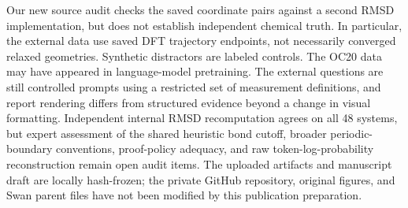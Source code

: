 Our new source audit checks the saved coordinate pairs against a second RMSD implementation, but does not establish independent chemical truth. In particular, the external data use saved DFT trajectory endpoints, not necessarily converged relaxed geometries. Synthetic distractors are labeled controls. The OC20 data may have appeared in language-model pretraining. The external questions are still controlled prompts using a restricted set of measurement definitions, and report rendering differs from structured evidence beyond a change in visual formatting. Independent internal RMSD recomputation agrees on all 48 systems, but expert assessment of the shared heuristic bond cutoff, broader periodic-boundary conventions, proof-policy adequacy, and raw token-log-probability reconstruction remain open audit items. The uploaded artifacts and manuscript draft are locally hash-frozen; the private GitHub repository, original figures, and Swan parent files have not been modified by this publication preparation.
